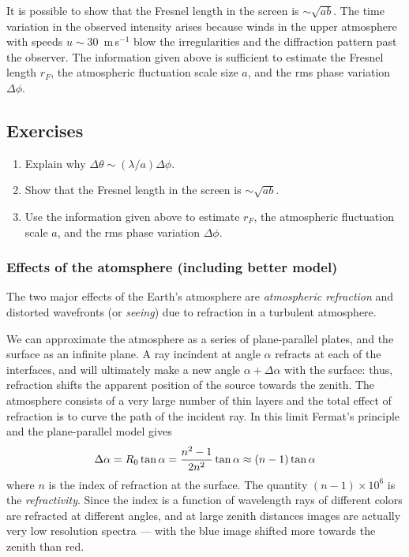 It is possible to show that the Fresnel length in the screen is 
$\sim\sqrt{ab}$. The time variation in the observed intensity arises because 
winds in the upper atmosphere with speeds $u\sim 30$~m$\,$s$^{-1}$ blow 
the irregularities and the diffraction pattern past the observer. The 
information given above is sufficient to estimate the Fresnel length $r_{F}$, 
the atmospheric fluctuation scale size $a$, and the rms phase variation 
$\Delta\phi$.

\subsection*{Exercises}
\begin{enumerate}
\setcounter{enumi}{\value{count}}
\item Explain why $\Delta\theta\sim({\lambda/a})\Delta\phi$.
\item Show that the Fresnel length in the screen is $\sim\sqrt{ab}$. 
\item Use the information given above to estimate $r_F$, the atmospheric fluctuation
scale $a$, and the rms phase variation $\Delta\phi$.
\setcounter{count}{\value{enumi}}
\end{enumerate}

\subsubsection{Effects of the atomsphere (including better model)}

The two major effects of the Earth's atmosphere are {\it atmospheric
  refraction} and distorted wavefronts (or {\it seeing}) due to
refraction in a turbulent atmosphere.

We can approximate the atmosphere as a series of plane-parallel
plates, and the surface as an infinite plane. A ray incindent at angle
$\alpha$ refracts at each of the interfaces, and will ultimately make
a new angle $\alpha+\Delta\alpha$ with the surface: thus, refraction
shifts the apparent position of the source towards the zenith. The
atmosphere consists of a very large number of thin layers and the
total effect of refraction is to curve the path of the incident
ray. In this limit Fermat's principle and the plane-parallel model
gives 
\[
\Delta\alpha=R_0\tan{\alpha}={n^2-1\over 2n^2}\tan{\alpha}\approx
(n-1)\tan{\alpha}
\]
where $n$ is the index of refraction at the surface. The quantity
$(n-1)\times 10^6$ is the {\it refractivity}. Since the index is a
function of wavelength rays of different colors are refracted at
different angles, and at large zenith distances images are actually
very low resolution spectra --- with the blue image shifted more
towards the zenith than red.

